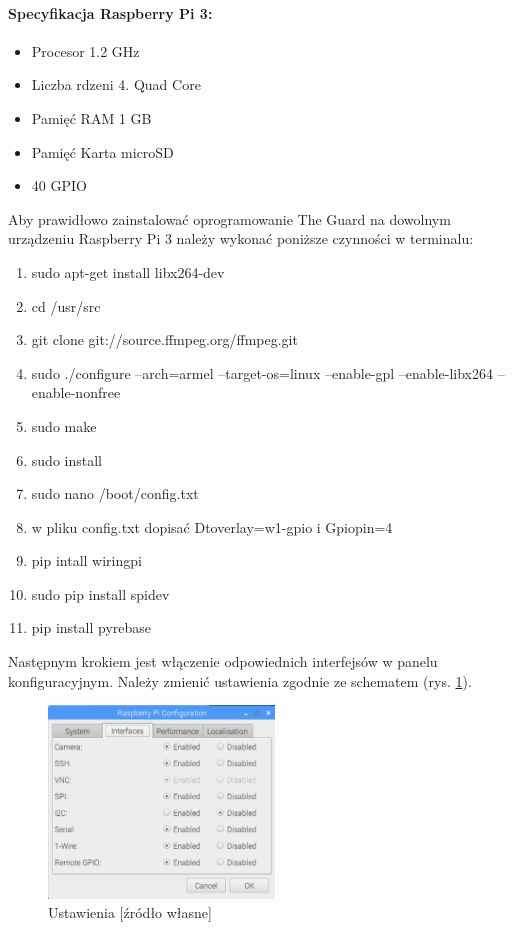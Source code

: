 \paragraph{Specyfikacja Raspberry Pi 3:}
\begin{itemize} 
\item Procesor 1.2 GHz
\item Liczba rdzeni 4. Quad Core
\item Pamięć RAM 1 GB
\item Pamięć Karta microSD
\item 40 GPIO
\end{itemize}
Aby prawidłowo zainstalować oprogramowanie The Guard na dowolnym urządzeniu Raspberry Pi 3 należy wykonać poniższe czynności w terminalu:
\begin{enumerate} 
\item sudo apt-get install libx264-dev
\item cd /usr/src
\item git clone git://source.ffmpeg.org/ffmpeg.git
\item sudo ./configure --arch=armel --target-os=linux --enable-gpl --enable-libx264 --enable-nonfree
\item sudo make
\item sudo install
\item sudo nano /boot/config.txt
\item w pliku config.txt dopisać Dtoverlay=w1-gpio i Gpiopin=4
\item pip intall wiringpi
\item sudo pip install spidev
\item pip install pyrebase
\end{enumerate}
Następnym krokiem jest włączenie odpowiednich interfejsów w panelu konfiguracyjnym. Należy zmienić ustawienia zgodnie ze schematem (rys. \ref{rs_settings}).
\begin{figure}[ht]
	\centering
	\includegraphics[width=6cm]{RSettings}
	\caption{Ustawienia [źródło własne]}
	\label{rs_settings}
\end{figure}
